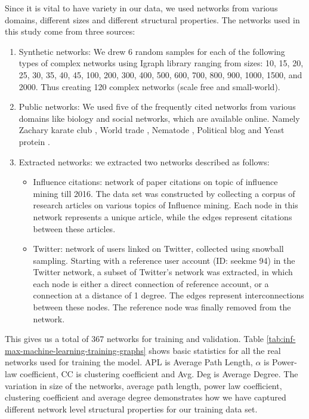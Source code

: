 			Since it is vital to have variety in our data, we used networks from various domains, different sizes and different structural properties. The networks used in this study come from three sources:
			
			\begin{enumerate}
				\item Synthetic networks: We drew 6 random samples for each of the following types of complex networks using Igraph library \cite{igraph2006,barabasi1999,holme2002b} ranging from sizes: 10, 15, 20, 25, 30, 35, 40, 45, 100, 200, 300, 400, 500, 600, 700, 800, 900, 1000, 1500, and 2000. Thus creating 120 complex networks (scale free and small-world).
				
				\item Public networks: We used five of the frequently cited networks from various domains like biology and social networks, which are available online. Namely Zachary karate club \cite{zachary1977}, World trade \cite{smith1992}, Nematode \cite{white1986}, Political blog \cite{adamic2005} and Yeast protein \cite{jeong2001}.
				
				\item Extracted networks: we extracted two networks described as follows:
				
				\begin{itemize}
					\item Influence citations: network of paper citations on topic of influence mining till 2016. The data set was constructed by collecting a corpus of research articles on various topics of Influence mining. Each node in this network represents a unique article, while the edges represent citations between these articles.
					
					\item Twitter: network of users linked on Twitter, collected using snowball sampling. Starting with a reference user account (ID: seekme 94) in the Twitter network, a subset of Twitter’s network was extracted, in which each node is either a direct connection of reference account, or a connection at a distance of 1 degree. The edges represent interconnections between these nodes. The reference node was finally removed from the network.
				\end{itemize}
			\end{enumerate}
			
			This gives us a total of 367 networks for training and validation. Table \ref{tab:inf-max-machine-learning-training-graphs} shows basic statistics for all the real networks used for training the model. APL is Average Path Length, $\alpha$ is Power-law coefficient, CC is clustering coefficient and Avg. Deg is Average Degree. The variation in size of the networks, average path length, power law coefficient, clustering coefficient and average degree demonstrates how we have captured different network level structural properties for our training data set.
		
